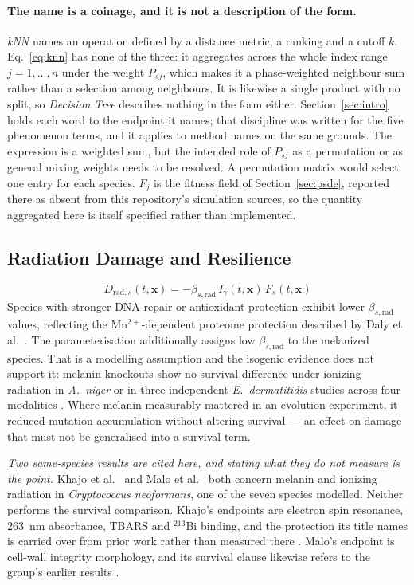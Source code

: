 \documentclass[11pt]{article}
\begin{document}
\paragraph{The name is a coinage, and it is not a description of the form.}
\emph{kNN} names an operation defined by a distance metric, a ranking and a cutoff $k$.
Eq.~\ref{eq:knn} has none of the three: it aggregates across the whole index range $j=1,\dots,n$
under the weight $P_{sj}$, which makes it a phase-weighted neighbour sum rather than a selection
among neighbours. It is likewise a single product with no split, so \emph{Decision Tree}
describes nothing in the form either. Section~\ref{sec:intro} holds each word to the endpoint it
names; that discipline was written for the five phenomenon terms, and it applies to method names
on the same grounds. The expression is a weighted sum, but the intended role of $P_{sj}$
as a permutation or as general mixing weights needs to be resolved. A permutation matrix
would select one entry for each species. $F_j$ is the fitness field of
Section~\ref{sec:psde}, reported there as absent from this repository's simulation sources, so
the quantity aggregated here is itself specified rather than implemented.

\subsection{Radiation Damage and Resilience}
\label{app:damage}

\begin{equation}
\label{eq:damage}
D_{\mathrm{rad},s}(t,\mathbf{x}) = -\beta_{s,\mathrm{rad}}\,I_\gamma(t,\mathbf{x})\,F_s(t,\mathbf{x})
\end{equation}
Species with stronger DNA repair or antioxidant protection exhibit lower $\beta_{s,\mathrm{rad}}$
values, reflecting the Mn$^{2+}$-dependent proteome protection described by Daly et al.\
\cite{daly2010}. The parameterisation additionally assigns low $\beta_{s,\mathrm{rad}}$ to the
melanized species. That is a modelling assumption and the isogenic evidence does not support it:
melanin knockouts show no survival difference under ionizing radiation in \textit{A.\ niger}
\cite{cortesao2020} or in three independent \textit{E.\ dermatitidis} studies across four
modalities \cite{audit2026}. Where melanin measurably mattered in an evolution experiment, it
reduced mutation accumulation without altering survival --- an effect on damage that must not be
generalised into a survival term.

\emph{Two same-species results are cited here, and stating what they do not measure is the
point.} Khajo et al.\ \cite{khajo2011} and Malo et al.\ \cite{malo2018} both concern
melanin and ionizing radiation in \textit{Cryptococcus neoformans}, one of the seven species
modelled. Neither performs the survival comparison. Khajo's endpoints are electron spin
resonance, 263~nm absorbance, TBARS and $^{213}$Bi binding, and the protection its title
names is carried over from prior work rather than measured there \cite{audit2026}. Malo's
endpoint is cell-wall integrity morphology, and its survival clause likewise refers to the
group's earlier results \cite{audit2026}.
\end{document}
